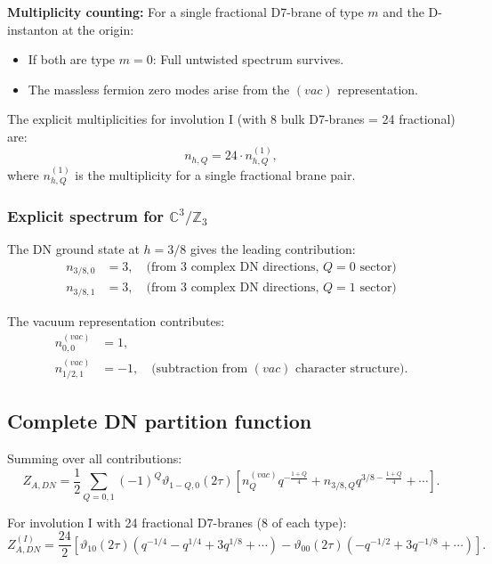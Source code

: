 \documentclass[11pt]{article}
\newcommand{\Z}{\mathbb{Z}}
\newcommand{\C}{\mathbb{C}}
\newcommand{\vt}{\vartheta}
\begin{document}
\textbf{Multiplicity counting:}
For a single fractional D7-brane of type $m$ and the D-instanton at the origin:
\begin{itemize}
\item If both are type $m=0$: Full untwisted spectrum survives.
\item The massless fermion zero modes arise from the $(vac)$ representation.
\end{itemize}

The explicit multiplicities for involution I (with 8 bulk D7-branes = 24 fractional) are:
\begin{equation}
n_{h,Q} = 24 \cdot n^{(1)}_{h,Q},
\end{equation}
where $n^{(1)}_{h,Q}$ is the multiplicity for a single fractional brane pair.

\subsubsection{Explicit spectrum for $\C^3/\Z_3$}

The DN ground state at $h = 3/8$ gives the leading contribution:
\begin{align}
n_{3/8, 0} &= 3, \quad \text{(from 3 complex DN directions, $Q=0$ sector)} \\
n_{3/8, 1} &= 3, \quad \text{(from 3 complex DN directions, $Q=1$ sector)}
\end{align}

The vacuum representation contributes:
\begin{align}
n_{0,0}^{(vac)} &= 1, \\
n_{1/2,1}^{(vac)} &= -1, \quad \text{(subtraction from $(vac)$ character structure)}.
\end{align}

\subsection{Complete DN partition function}

Summing over all contributions:
\begin{equation}
Z_{A,DN} = \frac{1}{2} \sum_{Q=0,1} (-1)^Q \vt_{1-Q,0}(2\tau) \left[ n^{(vac)}_{Q} q^{-\frac{1+Q}{4}} + n_{3/8,Q} q^{3/8 - \frac{1+Q}{4}} + \cdots \right].
\end{equation}

For involution I with 24 fractional D7-branes (8 of each type):
\begin{equation}\label{eq:ZADNexplicit}
Z_{A,DN}^{(I)} = \frac{24}{2} \left[ \vt_{10}(2\tau) \left( q^{-1/4} - q^{1/4} + 3 q^{1/8} + \cdots \right) - \vt_{00}(2\tau) \left( -q^{-1/2} + 3 q^{-1/8} + \cdots \right) \right].
\end{equation}
\end{document}
